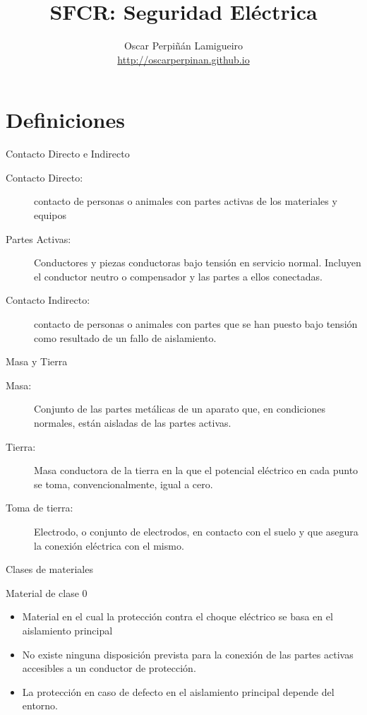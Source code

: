 \documentclass[xcolor={usenames,svgnames,dvipsnames}]{beamer}
\author{Oscar Perpiñán Lamigueiro \\ \url{http://oscarperpinan.github.io}}
\date{}
\title{SFCR: Seguridad Eléctrica}
\begin{document}
\maketitle


\section{Definiciones}
\label{sec:org1c7b8bf}

\begin{frame}[label={sec:orgcbf7cd1}]{Contacto Directo e Indirecto}
\begin{description}
\item[{Contacto Directo:}] contacto de personas o animales con partes
activas de los materiales y equipos

\item[{Partes Activas:}] Conductores y piezas conductoras bajo tensión en
servicio normal. Incluyen el conductor neutro o compensador y las
partes a ellos conectadas.

\item[{Contacto Indirecto:}] contacto de personas o animales con partes que
se han puesto bajo tensión como resultado de un fallo de aislamiento.
\end{description}
\end{frame}

\begin{frame}[label={sec:org765dffb}]{Masa y Tierra}
\begin{description}
\item[{Masa:}] Conjunto de las partes metálicas de un aparato que, en
condiciones normales, están aisladas de las partes activas.

\item[{Tierra:}] Masa conductora de la tierra en la que el potencial
eléctrico en cada punto se toma, convencionalmente, igual a cero.

\item[{Toma de tierra:}] Electrodo, o conjunto de electrodos, en contacto
con el suelo y que asegura la conexión eléctrica con el mismo.
\end{description}
\end{frame}

\begin{frame}[label={sec:org1627d8a}]{Clases de materiales}
\begin{block}{Material de clase 0}
\begin{itemize}
\item Material en el cual la protección contra el choque eléctrico se basa
en el aislamiento principal
\item No existe ninguna disposición prevista para la conexión de las
partes activas accesibles a un conductor de protección.
\item La protección en caso de defecto en el aislamiento principal depende
del entorno.
\end{itemize}
\end{block}
\end{frame}
\end{document}
